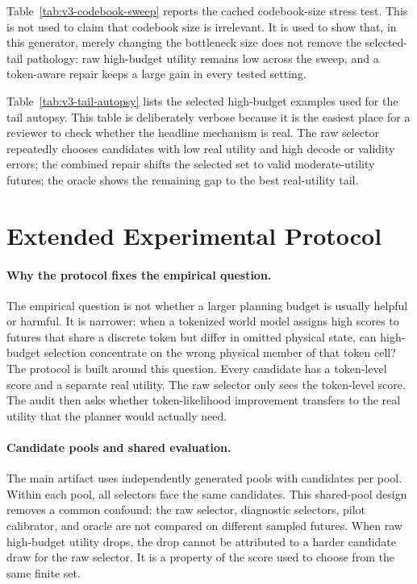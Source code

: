 

Table~\ref{tab:v3-codebook-sweep} reports the cached codebook-size stress test. This is not used to claim that codebook size is irrelevant. It is used to show that, in this generator, merely changing the bottleneck size does not remove the selected-tail pathology: raw high-budget utility remains low across the sweep, and a token-aware repair keeps a large gain in every tested setting.



Table~\ref{tab:v3-tail-autopsy} lists the selected high-budget examples used for the tail autopsy. This table is deliberately verbose because it is the easiest place for a reviewer to check whether the headline mechanism is real. The raw selector repeatedly chooses candidates with low real utility and high decode or validity errors; the combined repair shifts the selected set to valid moderate-utility futures; the oracle shows the remaining gap to the best real-utility tail.



\section{Extended Experimental Protocol}
\label{app:extended-protocol}

\paragraph{Why the protocol fixes the empirical question.}
The empirical question is not whether a larger planning budget is usually helpful or harmful. It is narrower: when a tokenized world model assigns high scores to futures that share a discrete token but differ in omitted physical state, can high-budget selection concentrate on the wrong physical member of that token cell? The protocol is built around this question. Every candidate has a token-level score and a separate real utility. The raw selector only sees the token-level score. The audit then asks whether token-likelihood improvement transfers to the real utility that the planner would actually need.

\paragraph{Candidate pools and shared evaluation.}
The main artifact uses \VThreePools{} independently generated pools with \VThreePoolSize{} candidates per pool. Within each pool, all selectors face the same candidates. This shared-pool design removes a common confound: the raw selector, diagnostic selectors, pilot calibrator, and oracle are not compared on different sampled futures. When raw high-budget utility drops, the drop cannot be attributed to a harder candidate draw for the raw selector. It is a property of the score used to choose from the same finite set.

